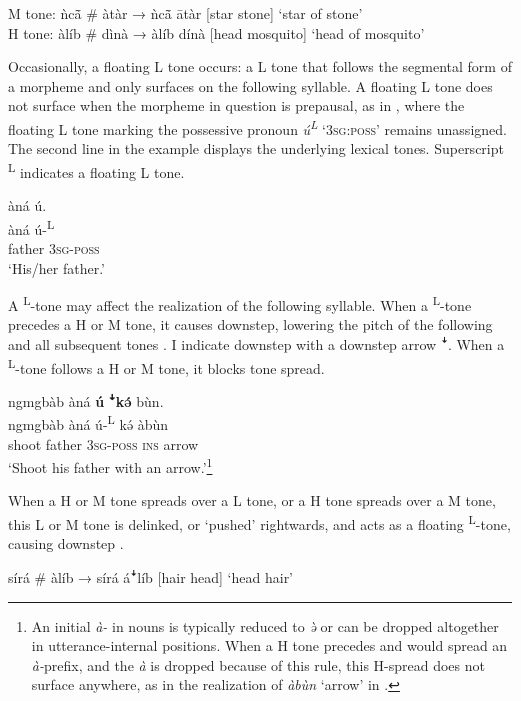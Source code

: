 \documentclass[output=paper,colorlinks,citecolor=brown]{langscibook}
\begin{document}
\ea\label{ex:kam:1}
    M tone: ǹc\={ã}  \# àtàr → ǹc\={ã}  ātàr [star stone] ‘star of stone’\\
    H tone: àlíb \# dìnà → àlíb dínà [head mosquito] ‘head of mosquito’
\z

Occasionally, a floating L tone occurs: a L tone that follows the segmental form of a morpheme and only surfaces on the following syllable. A floating L tone does not surface when the morpheme in question is prepausal, as in , where the floating L tone marking the possessive pronoun \textit{ú\textsuperscript{L}} ‘3\textsc{sg:poss’} remains unassigned. The second line in the example displays the underlying lexical tones. Superscript \textsuperscript{L} indicates a floating L tone.

\ea\label{ex:kam:2} 
    \glll àná ú.\\
          àná ú-\textsuperscript{L}\\
          father 3\textsc{sg-poss}\\
    \glt ‘His/her father.’
\z 

A \textsuperscript{L}{}-tone may affect the realization of the following syllable. When a \textsuperscript{L}{}-tone precedes a H or M tone, it causes downstep, lowering the pitch of the following and all subsequent tones . I indicate downstep with a downstep arrow ꜜ. When a \textsuperscript{L}{}-tone follows a H or M tone, it blocks tone spread.

\ea\label{ex:kam:3} 
    \glll ngmgbàb àná \textbf{ú} \textbf{ꜜkə́} bùn.\\
        ngmgbàb àná ú-\textsuperscript{L} kə́ àbùn\\
        shoot father \textsc{3sg-poss} \textsc{ins} arrow\\
    \glt ‘Shoot his father with an arrow.’\footnote{An initial \textit{à-} in nouns is typically reduced to \textit{ə̀} or can be dropped altogether in utterance-internal positions. When a H tone precedes and would spread an \textit{à-}prefix, and the \textit{à} is dropped because of this rule, this H-spread does not surface anywhere, as in the realization of \textit{àbùn} ‘arrow’ in .}
\z 

When a H or M tone spreads over a L tone, or a H tone spreads over a M tone, this L or M tone is delinked, or ‘pushed’ rightwards, and acts as a floating \textsuperscript{L}-tone, causing downstep .

\ea\label{ex:kam:4} 
    sírá \# àlíb → sírá áꜜlíb [hair head] ‘head hair’
\z 
\end{document}
